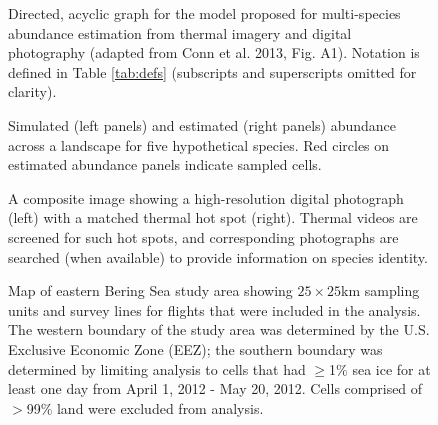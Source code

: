 \documentclass[12pt,fleqn]{article}
\begin{document}
\begin{flushleft}
\pagebreak

\begin{figure}
\begin{center}
\end{center}
\caption{Directed, acyclic graph for the model proposed for multi-species abundance estimation from thermal imagery and digital photography (adapted from Conn et al. 2013, Fig. A1).  Notation is defined in Table \ref{tab:defs} (subscripts and superscripts omitted for clarity).}
\label{fig:DAG}
\end{figure}

\begin{figure}
\begin{center}
\end{center}
\caption{Simulated (left panels) and estimated (right panels) abundance across a landscape for five hypothetical species.  Red
circles on estimated abundance panels indicate sampled cells.}
\label{fig:sim_est}
\end{figure}

\begin{figure}[H]
\begin{center}
\end{center}
\caption{A composite image showing a high-resolution digital photograph (left) with a matched
thermal hot spot (right).  Thermal videos are screened for such hot spots, and corresponding
photographs are searched (when available) to provide information on species identity.}
\label{fig:hotspot}
\end{figure}

\begin{figure}
\begin{center}
\end{center}
\caption{Map of eastern Bering Sea study area showing $25 \times 25$km sampling units and
   survey lines for flights that were included in the analysis.  The western boundary of the study area was determined by the U.S. Exclusive Economic Zone (EEZ); the southern boundary was determined by limiting analysis to cells that had $\ge$1\% sea ice for at least one day from April 1, 2012 - May 20, 2012.  Cells comprised of $>$99\% land were excluded from analysis.}
\label{fig:flights}
\end{figure}


\end{flushleft}
\end{document}
